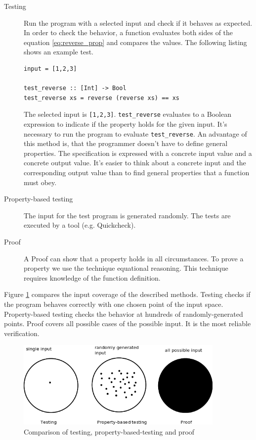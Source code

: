 \begin{description}
\item[Testing] Run the program with a selected input and check if it behaves as expected. In order to check the behavior, a function evaluates both sides of the equation \ref{eq:reverse_prop} and compares the values. The following listing shows an example test.

\begin{lstlisting}[caption={Function definition for testing},label={lst:testing}]
input = [1,2,3]

test_reverse :: [Int] -> Bool
test_reverse xs = reverse (reverse xs) == xs
\end{lstlisting}

The selected input is \verb|[1,2,3]|. \verb|test_reverse| evaluates to a Boolean expression to indicate if the property holds for the given input. It's necessary to run the program to evaluate \verb|test_reverse|.
An advantage of this method is, that the programmer doesn't have to define general properties. The specification is expressed with a concrete input value and a concrete output value. It's easier to think about a concrete input and the corresponding output value than to find general properties that a function must obey.
\item[Property-based testing] The input for the test program is generated randomly. The tests are executed by a tool (e.g. Quickcheck).
\item[Proof] A Proof can show that a property holds in all circumstances. To prove a property we use the technique equational reasoning. This technique requires knowledge of the function definition.
\end{description}

Figure \ref{fig:property_validation} compares the input coverage of the described methods. Testing checks if the program behaves correctly with one chosen point of the input space. Property-based testing checks the behavior at hundreds of randomly-generated points. Proof covers all possible cases of the possible input. It is the most reliable verification.

\begin{figure}
  \centering
     \includegraphics[width=0.9\textwidth]{testing}
  \caption{Comparison of testing, property-based-testing and proof}
  \label{fig:property_validation}
\end{figure}

